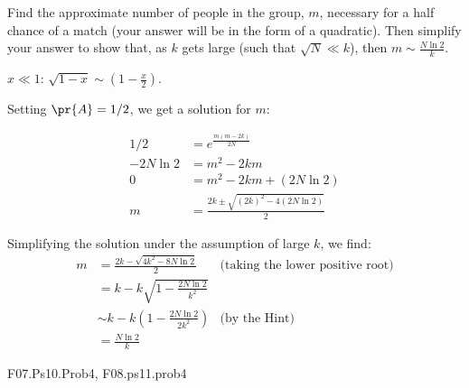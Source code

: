 \documentclass[handout]{mcs}
\begin{document}
\begin{problem}
\ppart Find the approximate number of people in the group, $m$,
necessary for a half chance of a match (your answer will be in the
form of a quadratic). Then simplify your answer to show that, as $k$
gets large (such that $\sqrt{N} \ll k$), then $m \sim
\frac{N\ln2}{k}$.

\hint $x \ll 1$: $\sqrt{1-x} \sim (1-\frac{x}{2})$.

\begin{solution}

Setting $\pr{A} = 1/2$, we get a solution for $m$:

\begin{align*}
1/2 &= e^{\frac{m(m-2k)}{2N}} \\
-2N\ln2 &= m^2 -2km  \\
0 &= m^2-2km + (2N\ln2) \\
m &= \frac{2k \pm \sqrt{(2k)^2 - 4(2N\ln2)}}{2}
\end{align*}

Simplifying the solution under the assumption of large $k$, we find:
\begin{align*}
m &= \frac{2k - \sqrt{4k^2 - 8N\ln2}}{2} & \text{(taking the lower positive root)} \\
&= k - k\sqrt{1 - \frac{2N\ln2}{k^2}} \\
&\sim k  - k \left(1-\frac{2N\ln2}{2k^2}\right) & \text{(by the Hint)} \\
&= \frac{N\ln2}{k}
\end{align*}

\end{solution}

\eparts

\end{problem}





\begin{staffnotes}
F07.Ps10.Prob4, F08.ps11.prob4
\end{staffnotes}
\end{document}
